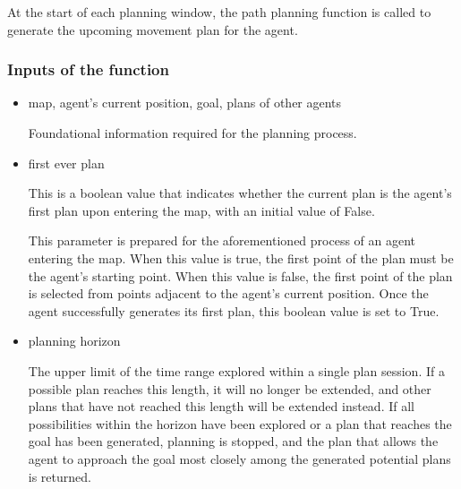 At the start of each planning window, the path planning function is called to generate the upcoming movement plan for the agent.

\subsubsection{Inputs of the function}

\begin{itemize}
    \item map, agent's current position, goal, plans of other agents

    Foundational information required for the planning process.

    \item first ever plan
    
    This is a boolean value that indicates whether the current plan is the agent's first plan upon entering the map, with an initial value of False.


    This parameter is prepared for the aforementioned process of an agent entering the map. When this value is true, the first point of the plan must be the agent's starting point. When this value is false, the first point of the plan is selected from points adjacent to the agent's current position.
    Once the agent successfully generates its first plan, this boolean value is set to True.


    \item planning horizon

    The upper limit of the time range explored within a single plan session. 
    If a possible plan reaches this length, it will no longer be extended, and other plans that have not reached this length will be extended instead.
    If all possibilities within the horizon have been explored or a plan that reaches the goal has been generated, planning is stopped, 
    and the plan that allows the agent to approach the goal most closely among the generated potential plans is returned.




\end{itemize}
